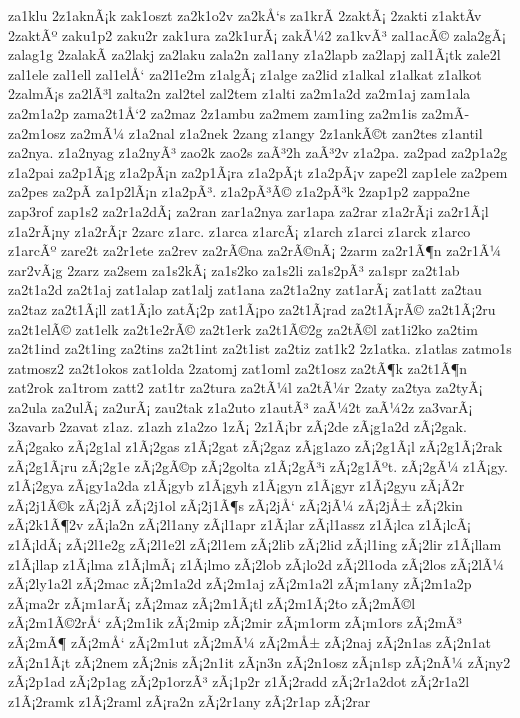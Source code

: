 {za1klu
2z1aknÃ¡k
zak1oszt
za2k1o2v
za2kÅ‘s
za1krÃ­
2zaktÃ¡
2zakti
z1aktÃ­v
2zaktÃº
zaku1p2
zaku2r
zak1ura
za2k1urÃ¡
zakÃ¼2
za1kvÃ³
zal1acÃ©
zala2gÃ¡
zalag1g
2zalakÃ­
za2lakj
za2laku
zala2n
zal1any
z1a2lapb
za2lapj
zal1Ã¡tk
zale2l
zal1ele
zal1ell
zal1elÅ‘
za2l1e2m
z1algÃ¡
z1alge
za2lid
z1alkal
z1alkat
z1alkot
2zalmÃ¡s
za2lÃ³l
zalta2n
zal2tel
zal2tem
z1alti
za2m1a2d
za2m1aj
zam1ala
za2m1a2p
zama2t1Å‘2
za2maz
2z1ambu
za2mem
zam1ing
za2m1is
za2mÃ­
za2m1osz
za2mÃ¼
z1a2nal
z1a2nek
2zang
z1angy
2z1ankÃ©t
zan2tes
z1antil
za2nya.
z1a2nyag
z1a2nyÃ³
zao2k
zao2s
zaÃ³2h
zaÃ³2v
z1a2pa.
za2pad
za2p1a2g
z1a2pai
za2p1Ã¡g
z1a2pÃ¡n
za2p1Ã¡ra
z1a2pÃ¡t
z1a2pÃ¡v
zape2l
zap1ele
za2pem
za2pes
za2pÃ­
za1p2lÃ¡n
z1a2pÃ³.
z1a2pÃ³Ã©
z1a2pÃ³k
2zap1p2
zappa2ne
zap3rof
zap1s2
za2r1a2dÃ¡
za2ran
zar1a2nya
zar1apa
za2rar
z1a2rÃ¡i
za2r1Ã¡l
z1a2rÃ¡ny
z1a2rÃ¡r
2zarc
z1arc.
z1arca
z1arcÃ¡
z1arch
z1arci
z1arck
z1arco
z1arcÃº
zare2t
za2r1ete
za2rev
za2rÃ©na
za2rÃ©nÃ¡
2zarm
za2r1Ã¶n
za2r1Ã¼
zar2vÃ¡g
2zarz
za2sem
za1s2kÃ¡
za1s2ko
za1s2li
za1s2pÃ³
za1spr
za2t1ab
za2t1a2d
za2t1aj
zat1alap
zat1alj
zat1ana
za2t1a2ny
zat1arÃ¡
zat1att
za2tau
za2taz
za2t1Ã¡ll
zat1Ã¡lo
zatÃ¡2p
zat1Ã¡po
za2t1Ã¡rad
za2t1Ã¡rÃ©
za2t1Ã¡2ru
za2t1elÃ©
zat1elk
za2t1e2rÃ©
za2t1erk
za2t1Ã©2g
za2tÃ©l
zat1i2ko
za2tim
za2t1ind
za2t1ing
za2tins
za2t1int
za2t1ist
za2tiz
zat1k2
2z1atka.
z1atlas
zatmo1s
zatmosz2
za2t1okos
zat1olda
2zatomj
zat1oml
za2t1osz
za2tÃ¶k
za2t1Ã¶n
zat2rok
za1trom
zatt2
zat1tr
za2tura
za2tÃ¼l
za2tÃ¼r
2zaty
za2tya
za2tyÃ¡
za2ula
za2ulÃ¡
za2urÃ¡
zau2tak
z1a2uto
z1autÃ³
zaÃ¼2t
zaÃ¼2z
za3varÃ¡
3zavarb
2zavat
z1az.
z1azh
z1a2zo
1zÃ¡
2z1Ã¡br
zÃ¡2de
zÃ¡g1a2d
zÃ¡2gak.
zÃ¡2gako
zÃ¡2g1al
z1Ã¡2gas
z1Ã¡2gat
zÃ¡2gaz
zÃ¡g1azo
zÃ¡2g1Ã¡l
zÃ¡2g1Ã¡2rak
zÃ¡2g1Ã¡ru
zÃ¡2g1e
zÃ¡2gÃ©p
zÃ¡2golta
z1Ã¡2gÃ³i
zÃ¡2g1Ãºt.
zÃ¡2gÃ¼
z1Ã¡gy.
z1Ã¡2gya
zÃ¡gy1a2da
z1Ã¡gyb
z1Ã¡gyh
z1Ã¡gyn
z1Ã¡gyr
z1Ã¡2gyu
zÃ¡Ã­2r
zÃ¡2j1Ã©k
zÃ¡2jÃ­
zÃ¡2j1ol
zÃ¡2j1Ã¶s
zÃ¡2jÅ‘
zÃ¡2jÃ¼
zÃ¡2jÅ±
zÃ¡2kin
zÃ¡2k1Ã¶2v
zÃ¡la2n
zÃ¡2l1any
zÃ¡l1apr
z1Ã¡lar
zÃ¡l1assz
z1Ã¡lca
z1Ã¡lcÃ¡
z1Ã¡ldÃ¡
zÃ¡2l1e2g
zÃ¡2l1e2l
zÃ¡2l1em
zÃ¡2lib
zÃ¡2lid
zÃ¡l1ing
zÃ¡2lir
z1Ã¡llam
z1Ã¡llap
z1Ã¡lma
z1Ã¡lmÃ¡
z1Ã¡lmo
zÃ¡2lob
zÃ¡lo2d
zÃ¡2l1oda
zÃ¡2los
zÃ¡2lÃ¼
zÃ¡2ly1a2l
zÃ¡2mac
zÃ¡2m1a2d
zÃ¡2m1aj
zÃ¡2m1a2l
zÃ¡m1any
zÃ¡2m1a2p
zÃ¡ma2r
zÃ¡m1arÃ¡
zÃ¡2maz
zÃ¡2m1Ã¡tl
zÃ¡2m1Ã¡2to
zÃ¡2mÃ©l
zÃ¡2m1Ã©2rÅ‘
zÃ¡2m1ik
zÃ¡2mip
zÃ¡2mir
zÃ¡m1orm
zÃ¡m1ors
zÃ¡2mÃ³
zÃ¡2mÃ¶
zÃ¡2mÅ‘
zÃ¡2m1ut
zÃ¡2mÃ¼
zÃ¡2mÅ±
zÃ¡2naj
zÃ¡2n1as
zÃ¡2n1at
zÃ¡2n1Ã¡t
zÃ¡2nem
zÃ¡2nis
zÃ¡2n1it
zÃ¡n3n
zÃ¡2n1osz
zÃ¡n1sp
zÃ¡2nÃ¼
zÃ¡ny2
zÃ¡2p1ad
zÃ¡2p1ag
zÃ¡2p1orzÃ³
zÃ¡1p2r
z1Ã¡2radd
zÃ¡2r1a2dot
zÃ¡2r1a2l
z1Ã¡2ramk
z1Ã¡2raml
zÃ¡ra2n
zÃ¡2r1any
zÃ¡2r1ap
zÃ¡2rar
}
